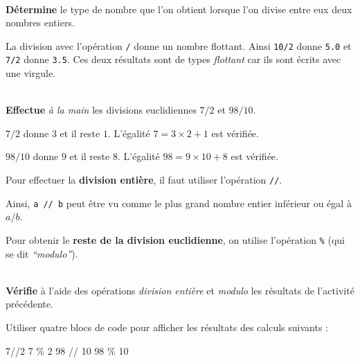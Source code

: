 \documentclass[a4paper,17pt]{extarticle}
\newenvironment{eleve}%
{\begin{activite}\color{noiramu}\\[-0.5cm]}
{\end{activite}}
\newenvironment{Shaded}{}{}
\newcommand{\DecValTok}[1]{\textcolor[rgb]{0.25,0.63,0.44}{{#1}}}
\newcommand{\OperatorTok}[1]{\textcolor[rgb]{0.40,0.40,0.40}{{#1}}}
\begin{document}
\begin{eleve}
    \textbf{Détermine} le type de nombre que l'on obtient lorsque l'on
divise entre eux deux nombres entiers.
        
        \end{eleve}\begin{reponse}
    La division avec l'opération \texttt{/} donne un nombre flottant. Ainsi
\texttt{10/2} donne \texttt{5.0} et \texttt{7/2} donne \texttt{3.5}. Ces
deux résultats sont de types \emph{flottant} car ils sont écrits avec
une virgule.

        \end{reponse}\begin{eleve}
    \textbf{Effectue} \emph{à la main} les divisions euclidiennes \(7 / 2\)
et \({98} / {10}\).
        
        \end{eleve}\begin{reponse}
    \(7/2\) donne \(3\) et il reste \(1\). L'égalité \(7 = 3 \times 2 + 1\)
est vérifiée.

\(98 / 10\) donne \(9\) et il reste \(8\). L'égalité
\(98 = 9 \times 10 + 8\) est vérifiée.

        \end{reponse}\begin{retenir}
    Pour effectuer la \textbf{division entière}, il faut utiliser
l'opération \texttt{//}.

Ainsi, \texttt{a\ //\ b} peut être vu comme le plus grand nombre entier
inférieur ou égal à \(a/b\).

        \end{retenir}\begin{retenir}
    Pour obtenir le \textbf{reste de la division euclidienne}, on utilise
l'opération \texttt{\%} (qui se dit \emph{``modulo''}).

        \end{retenir}\begin{eleve}
    \textbf{Vérifie} à l'aide des opérations \emph{division entière} et
\emph{modulo} les résultats de l'activité précédente.
        
        \end{eleve}\begin{reponse}
    Utiliser quatre blocs de code pour afficher les résultats des calculs
suivants :

\begin{Shaded}
\begin{Highlighting}[]
\DecValTok{7}\OperatorTok{//}\DecValTok{2}
\DecValTok{7} \OperatorTok{\%} \DecValTok{2}
\DecValTok{98} \OperatorTok{//} \DecValTok{10}
\DecValTok{98} \OperatorTok{\%} \DecValTok{10}
\end{Highlighting}
\end{Shaded}


\end{reponse}
\end{document}
